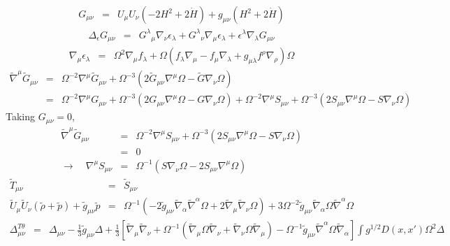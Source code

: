 \documentclass[10pt,letterpaper]{article}
\numberwithin{equation}{section}
\begin{document}
\begin{eqnarray}
G_{\mu\nu} &=& U_\mu U_\nu (-2H^2 + 2\dot H)+ g_{\mu\nu}(H^2+2\dot H)
\end{eqnarray}
\begin{eqnarray}
\Delta_\epsilon G_{\mu\nu} &=& G^\lambda{}_\mu \nabla_\nu \epsilon_\lambda + G^\lambda{}_\nu \nabla_\mu \epsilon_\lambda + \epsilon^\lambda\nabla_\lambda G_{\mu\nu} 
\end{eqnarray}
\begin{eqnarray}
\nabla_\mu \epsilon_\lambda &=& \Omega^2 \nabla_\mu f_\lambda + \Omega(f_\lambda \nabla_\mu - f_\mu \nabla_\lambda + g_{\mu\lambda}f^\rho \nabla_\rho)\Omega
\end{eqnarray}
\begin{eqnarray}
\tilde \nabla^\mu \tilde G_{\mu\nu} &=& \Omega^{-2}\nabla^\mu \tilde G_{\mu\nu} +\Omega^{-3}\left( 
2\tilde G_{\mu\nu}\nabla^\mu \Omega - \tilde G \nabla_\nu \Omega\right)
\nonumber\\
&=& \Omega^{-2}\nabla^\mu  G_{\mu\nu} +\Omega^{-3}\left( 
2 G_{\mu\nu}\nabla^\mu \Omega -  G \nabla_\nu \Omega\right)
+\Omega^{-2}\nabla^\mu  S_{\mu\nu} +\Omega^{-3}\left( 
2 S_{\mu\nu}\nabla^\mu \Omega - S \nabla_\nu \Omega\right)
\end{eqnarray}
Taking $G_{\mu\nu} = 0$,
\begin{eqnarray}
\tilde \nabla^\mu \tilde G_{\mu\nu} &=& \Omega^{-2}\nabla^\mu  S_{\mu\nu} +\Omega^{-3}\left( 
2 S_{\mu\nu}\nabla^\mu \Omega - S \nabla_\nu \Omega\right)
\nonumber\\
&=&0
\nonumber\\
\to  \quad\nabla^\mu S_{\mu\nu} &=& \Omega^{-1}\left( S\nabla_\nu \Omega - 2S_{\mu\nu}\nabla^\mu \Omega\right) 
\end{eqnarray}
\begin{eqnarray}
\tilde T_{\mu\nu} &=& \tilde S_{\mu\nu}
\nonumber\\
\tilde U_{\mu}\tilde U_{\nu}(\tilde\rho+\tilde p) + \tilde g_{\mu\nu} \tilde p &=&  \Omega^{-1}\left( -2 \tilde g_{\mu\nu}\tilde\nabla_\alpha \tilde\nabla^\alpha \Omega + 2\tilde\nabla_\mu\tilde\nabla_\nu \Omega\right) + 3\Omega^{-2} \tilde g_{\mu\nu} \tilde\nabla_\alpha \Omega \tilde\nabla^\alpha \Omega
\end{eqnarray}
\begin{eqnarray}
\Delta^{T\theta}_{\mu\nu} &=& \Delta_{\mu\nu} -\frac13 \tilde g_{\mu\nu}\Delta +\frac13 \left[ \tilde\nabla_\mu\tilde\nabla_\nu + \Omega^{-1}(\tilde\nabla_\mu\Omega \tilde\nabla_\nu + \tilde\nabla_\nu\Omega \tilde\nabla_\mu) -\Omega^{-1}\tilde g_{\mu\nu} \tilde\nabla^\alpha \Omega \tilde\nabla_\alpha \right]\int g^{1/2} D(x,x') \Omega^2 \Delta
\end{eqnarray}
\end{document}
